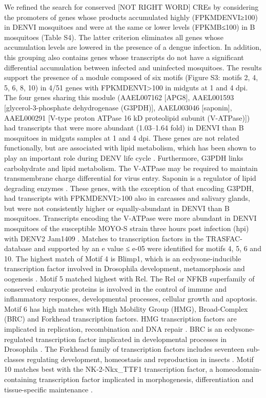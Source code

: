 We refined the search for \alert{conserved} [NOT RIGHT WORD] CREs by considering the promoters of genes whose products accumulated highly (FPKMDENVI≥100) in DENVI mosquitoes and were at the same or lower levels (FPKMB≤100) in B mosquitoes (Table S4).
The latter criterion eliminates all genes whose accumulation levels are lowered in the presence of a dengue infection.
In addition, this grouping also contains genes whose transcripts do not have a significant differential accumulation between infected and uninfected mosquitoes.
The results support the presence of a module composed of six motifs (Figure S3: motifs 2, 4, 5, 6, 8, 10) in 4/51 genes with FPKMDENVI>100 in midguts at 1 and 4 dpi.
The four genes sharing this module (AAEL007162 [APG8], AAEL001593 [glycerol-3-phosphate dehydrogenase (G3PDH)], AAEL003046 [saponin], AAEL000291 [V-type proton ATPase 16 kD proteolipid subunit (V-ATPase)]) had transcripts that were more abundant (1.03–1.64 fold) in DENVI than B mosquitoes in midguts samples at 1 and 4 dpi.
These genes are not related functionally, but are associated with lipid metabolism, which has been shown to play an important role during DENV life cycle \cite{Samsa2009}.
Furthermore, G3PDH links carbohydrate and lipid metabolism.
The V-ATPase may be required to maintain transmembrane charge differential for virus entry.
Saponin is a regulator of lipid degrading enzymes \cite{Lindholm2010}.
These genes, with the exception of that encoding G3PDH, had transcripts with FPKMDENVI>100 also in carcasses and salivary glands, but were not consistently higher or equally-abundant in DENVI than B mosquitoes.
Transcripts encoding the V-ATPase were more abundant in DENVI mosquitoes of the susceptible MOYO-S strain three hours post infection (hpi) with DENV2 Jam1409 \cite{Behura2011}.
Matches to transcription factors in the TRASFAC- database \cite{Matys2006} and supported by an e value ≤ e-05 were identified for motifs 4, 5, 6 and 10.
The highest match of Motif 4 is Blimp1, which is an ecdysone-inducible transcription factor involved in Drosophila development, metamorphosis and oogenesis \cite{Agawa2007}.
Motif 5 matched highest with Rel.
The Rel or \gls{NFKB} superfamily of conserved eukaryotic proteins is involved in the control of immune and inflammatory responses, developmental processes, cellular growth and apoptosis.
Motif 6 has high matches with High Mobility Group (HMG), Broad-Complex (BRC) and Forkhead transcription factors.
HMG transcription factors are implicated in replication, recombination and DNA repair \cite{Rajeswari2002}.
BRC is an ecdysone-regulated transcription factor implicated in developmental processes in Drosophila \cite{Sandstrom1997}.
The Forkhead family of transcription factors includes seventeen sub-classes regulating development, homeostasis and reproduction in insects \cite{Hansen2007}.
Motif 10 matches best with the NK-2-Nkx\_TTF1 transcription factor, a homeodomain-containing transcription factor implicated in morphogenesis, differentiation and tissue-specific maintenance \cite{Boggaram2009}.

